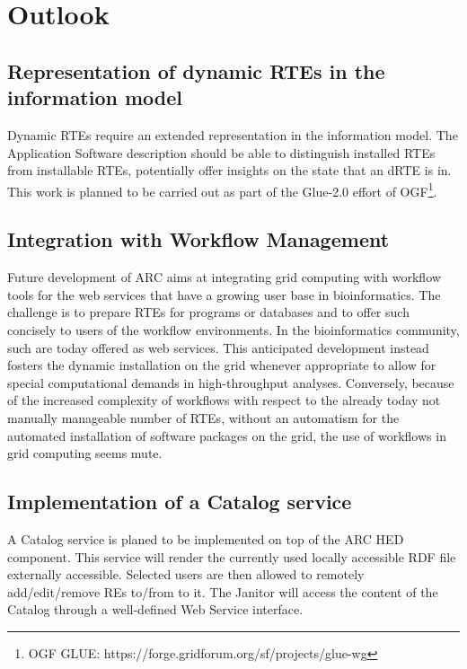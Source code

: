 \chapter{Outlook}
% 
% 

\section{Representation of dynamic RTEs in the information model}
Dynamic RTEs require an extended representation in the
information model.  The Application Software description should be able
to distinguish installed RTEs from installable RTEs, potentially offer
insights on the state that an dRTE is in. This work is planned
to be carried out as part of the Glue-2.0 effort of OGF\footnote{OGF
GLUE: https://forge.gridforum.org/sf/projects/glue-wg}.

\section{Integration with Workflow Management}

Future development of ARC aims at integrating grid computing with
workflow tools for the web services that have a growing user base in
bioinformatics. The challenge is to prepare RTEs for
programs or databases and to offer such concisely to users of the
workflow environments.  In the bioinformatics community, such are
today offered as web services.  This anticipated development instead
fosters the dynamic installation on the grid whenever appropriate to
allow for special computational demands in high-throughput analyses.
Conversely, because of the increased complexity of workflows with respect
to the already today not manually manageable number of RTEs, without an
automatism for the automated installation of software packages on the
grid, the use of workflows in grid computing seems mute.

\section{Implementation of a Catalog service}
 
A Catalog service is planed to be implemented on top of the ARC
HED component.  This service will render the currently used locally
accessible RDF file externally accessible. Selected users are then allowed
to remotely add/edit/remove REs to/from to it.  The Janitor will access
the content of the Catalog through a well-defined Web Service interface.

